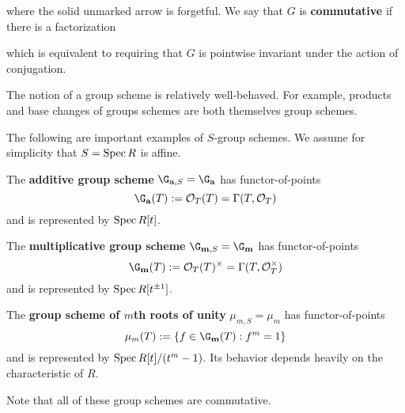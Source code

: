 \documentclass[11pt]{article}
\begin{document}
\begin{center}
\end{center}
where the solid unmarked arrow is forgetful. We say that $G$ is \textbf{commutative} if there is a factorization
\begin{center}
\end{center}
which is equivalent to requiring that $G$ is pointwise invariant under the action of conjugation.

\begin{remark}
The notion of a group scheme is relatively well-behaved. For example, products and base changes of groups schemes are both themselves group schemes.
\end{remark}

\begin{example}
The following are important examples of $S$-group schemes. We assume for simplicity that $S=\operatorname{Spec} R$ is affine.
\begin{enum}{\arabic}
\item The \textbf{additive group scheme} $\G_{\mathbf{a},S}=\G_{\mathbf{a}}$ has functor-of-points 
$$\G_{\mathbf{a}}(T):=\O_T(T)=\Gamma(T,\O_T)$$ 
and is represented by $\operatorname{Spec} R[t]$.
\item The \textbf{multiplicative group scheme} $\G_{\mathbf{m},S}=\G_{\mathbf{m}}$ has functor-of-points 
$$\G_{\mathbf{m}}(T):=\O_T(T)^{\times}=\Gamma(T,\O_T^{\times})$$ 
and is represented by $\operatorname{Spec} R[t^{\pm1}]$.
\item The \textbf{group scheme of $m$th roots of unity} $\mu_{m,S}=\mu_m$ has functor-of-points 
$$\mu_m(T):=\{f\in\G_{\mathbf{m}}(T) : f^m=1\}$$ 
and is represented by $\operatorname{Spec} R[t]/(t^m-1)$. Its behavior depends heavily on the characteristic of $R$.
\end{enum}
Note that all of these group schemes are commutative.
\end{example}
\end{document}
